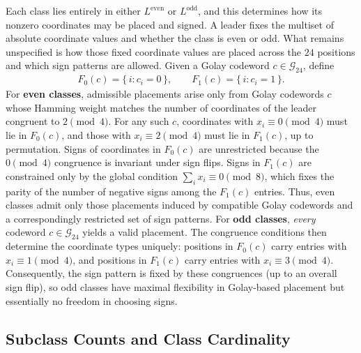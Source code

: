 \documentclass{article}
\theoremstyle{plain}
\theoremstyle{definition}
\theoremstyle{remark}
\begin{document}
Each class lies entirely in either $L^{\mathrm{even}}$ or $L^{\mathrm{odd}}$, and this determines how its nonzero coordinates may be placed and signed. A leader fixes the multiset of absolute coordinate values and whether the class is even or odd. What remains unspecified is how those fixed coordinate values are placed across the \(24\) positions and which sign patterns are allowed. Given a Golay codeword \(c \in \mathcal{G}_{24}\), define
{\setlength{\abovedisplayskip}{4pt}
\setlength{\belowdisplayskip}{4pt}
\setlength{\abovedisplayshortskip}{0pt}
\setlength{\belowdisplayshortskip}{1pt} %
\setlength{\jot}{3pt} %
\begin{align}
F_0(c) = \{\, i : c_i = 0 \,\},
\qquad
F_1(c) = \{\, i : c_i = 1 \,\}.
\end{align}
}
For \textbf{even classes}, admissible placements arise only from Golay codewords \(c\)
whose Hamming weight matches the number of coordinates of the leader
congruent to \(2 \pmod{4}\). For any such \(c\), coordinates with
\(x_i \equiv 0 \pmod{4}\) must lie in \(F_0(c)\), and those with
\(x_i \equiv 2 \pmod{4}\) must lie in \(F_1(c)\), up to permutation. Signs of
coordinates in \(F_0(c)\) are unrestricted because the \(0 \pmod{4}\)
congruence is invariant under sign flips. Signs in \(F_1(c)\) are constrained
only by the global condition \(\sum_i x_i \equiv 0 \pmod{8}\), which fixes
the parity of the number of negative signs among the \(F_1(c)\) entries.
Thus, even classes admit only those placements induced by compatible Golay
codewords and a correspondingly restricted set of sign patterns. For \textbf{odd classes}, \emph{every} codeword \(c \in \mathcal{G}_{24}\) yields a valid placement.
The congruence conditions then determine the coordinate types uniquely:
positions in \(F_0(c)\) carry entries with \(x_i \equiv 1 \pmod{4}\),
and positions in \(F_1(c)\) carry entries with \(x_i \equiv 3 \pmod{4}\).
Consequently, the sign pattern is fixed by these congruences (up to an overall
sign flip), so odd classes have maximal flexibility in Golay-based placement
but essentially no freedom in choosing signs.


\subsection{Subclass Counts and Class Cardinality}
\label{sec:subclasses}
\end{document}
